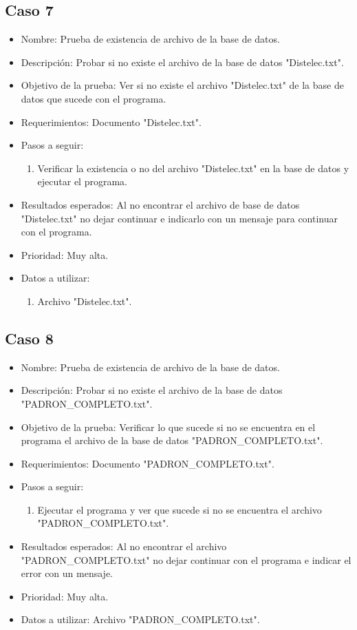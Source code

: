 \documentclass[conference]{IEEEtran}
\begin{document}
\subsection{Caso 7}
\begin{itemize}
\item Nombre: Prueba de existencia de archivo de la base de datos. 
\item Descripción: Probar si no existe el archivo de la base de datos "Distelec.txt".
\item Objetivo de la prueba: Ver si no existe el archivo "Distelec.txt" de la base de datos que sucede con el programa.
\item Requerimientos: Documento "Distelec.txt".
\item Pasos a seguir: 
\begin{enumerate}
\item Verificar la existencia o no del archivo "Distelec.txt" en la base de datos y ejecutar el programa. 
\end{enumerate} 
\item Resultados esperados: Al no encontrar el archivo de base de datos "Distelec.txt" no dejar continuar e indicarlo con un mensaje para continuar con el programa.
\item Prioridad: Muy alta.
\item Datos a utilizar: 
\begin{enumerate}
\item Archivo "Distelec.txt".
\end{enumerate}
\end{itemize}

\subsection{Caso 8}
\begin{itemize}
\item Nombre: Prueba de existencia de archivo de la base de datos.
\item Descripción: Probar si no existe el archivo de la base de datos "PADRON\_COMPLETO.txt".
\item Objetivo de la prueba: Verificar lo que sucede si no se encuentra en el programa el archivo de la base de datos "PADRON\_COMPLETO.txt".
\item Requerimientos: Documento "PADRON\_COMPLETO.txt".
\item Pasos a seguir:
\begin{enumerate}
\item Ejecutar el programa y ver que sucede si no se encuentra el archivo "PADRON\_COMPLETO.txt".
\end{enumerate}
\item Resultados esperados: Al no encontrar el archivo "PADRON\_COMPLETO.txt" no dejar continuar con el programa e indicar el error con un mensaje. 
\item Prioridad: Muy alta. 
\item Datos a utilizar: Archivo "PADRON\_COMPLETO.txt".
\end{itemize}
\end{document}
